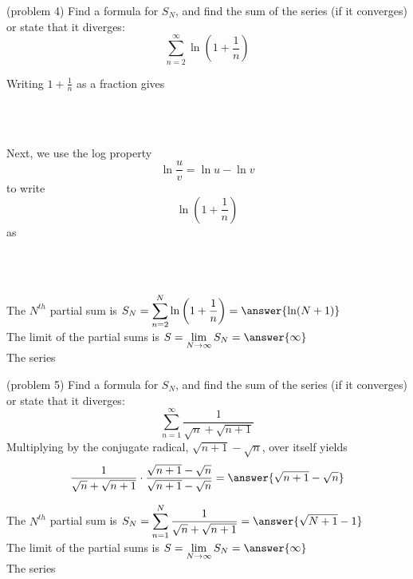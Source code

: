 \documentclass[handout]{ximera}
\begin{document}
\begin{problem}(problem 4)
Find a formula for $S_N$, and find the sum of the series (if it converges) or state that it diverges:
\[
\sum_{n=2}^\infty  \ln\left(1 + \frac{1}{n}\right) 
\]

Writing $1 + \frac{1}{n}$ as a fraction gives 
\begin{multipleChoice}
\\
\\
\end{multipleChoice}

Next, we use the log property 
\[
\ln\frac{u}{v} = \ln u - \ln v
\]
to write 
\[
\ln\left(1 + \frac{1}{n}\right)
\]
as 
\begin{multipleChoice}
\\
\\
\end{multipleChoice}

The $N^{th}$ partial sum is  $\displaystyle S_N = \sum_{n=2}^N \ln\left(1 + \frac{1}{n}\right) 
 =  \answer{\ln(N+1)}$\\

The limit of the partial sums is $\displaystyle S = \lim_{N\to \infty}S_N = \answer{\infty}$\\

The series 

\end{problem}


\begin{problem}(problem 5)
Find a formula for $S_N$, and find the sum of the series (if it converges) or state that it diverges:
\[
\sum_{n=1}^\infty  \frac{1}{\sqrt n + \sqrt{n+1}} 
\]
Multiplying by the conjugate radical, $\sqrt{n+1} - \sqrt{n}$, over itself yields
\[
\frac{1}{\sqrt n + \sqrt{n+1}} \cdot \frac{\sqrt{n+1} - \sqrt{n}}{\sqrt{n+1} - \sqrt{n}} = \answer{\sqrt{n+1} -\sqrt{n}}
\]

The $N^{th}$ partial sum is  $\displaystyle S_N = \sum_{n=1}^N \frac{1}{\sqrt n + \sqrt{n+1}} 
 =  \answer{\sqrt{N+1} - 1}$\\

The limit of the partial sums is $\displaystyle S = \lim_{N\to \infty}S_N = \answer{\infty}$\\

The series 

\end{problem}
\end{document}
